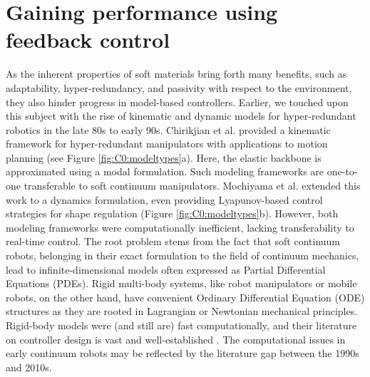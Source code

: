 \section{Gaining performance using feedback control}
\label{sec:C0:modelcontrol}
As the inherent properties of soft materials bring forth many benefits, such as adaptability, hyper-redundancy, and passivity with respect to the environment, they also hinder progress in model-based controllers. Earlier, we touched upon this subject with the rise of kinematic and dynamic models for hyper-redundant robotics in the late 80s to early 90s. Chirikjian et al. \cite{Chirikjian1992} provided a kinematic framework for hyper-redundant manipulators with applications to motion planning (see Figure \ref{fig:C0:modeltypes}a). Here, the elastic backbone is approximated using a modal formulation. Such modeling frameworks are one-to-one transferable to soft continuum manipulators. Mochiyama et al. \cite{Mochiyama1998,Mochiyama2003} extended this work to a dynamics formulation, even providing Lyapunov-based control strategies for shape regulation (Figure \ref{fig:C0:modeltypes}b). However, both modeling frameworks were computationally inefficient, lacking transferability to real-time control. The root problem stems from the fact that soft continuum robots, belonging in their exact formulation to the field of continuum mechanics, lead to infinite-dimensional models often expressed as Partial Differential Equations (PDEs). Rigid multi-body systems, like robot manipulators or mobile robots, on the other hand, have convenient Ordinary Differential Equation (ODE) structures as they are rooted in Lagrangian or Newtonian mechanical principles. Rigid-body models were (and still are) fast computationally, and their literature on controller design is vast and well-established \cite{Murray1994,Corke2011,Spong2006}. The computational issues in early continuum robots may be reflected by the literature gap between the 1990s and 2010s. \\


